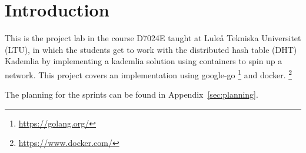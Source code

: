 \section{Introduction}\label{sec:introduction}

This is the project lab in the course D7024E taught at Luleå Tekniska
Universitet (LTU), in which the students get to work with the distributed hash
table (DHT) Kademlia by implementing a kademlia solution using containers to
spin up a network. This project covers an implementation using google-go
\footnote{\href{https://golang.org/}{https://golang.org/}} and docker.
\footnote{\href{https://www.docker.com/}{https://www.docker.com/}}

The planning for the sprints can be found in Appendix~\ref{sec:planning}.
